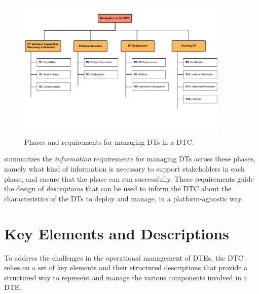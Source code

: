\begin{figure}
    \centering
    \includegraphics[width=0.9\textwidth]{figures/dtc/dtc-requirements.pdf}
    \caption{Phases and requirements for managing \acp{DT} in a \ac{DTC}.}
    \label{fig:dtc-requirements}
\end{figure}

 summarizes the \emph{information} requirements for managing \acp{DT} across these phases, namely what kind of information is necessary to support stakeholders in each phase, and ensure that the phase can run successfully.
%
These requirements guide the design of \emph{descriptions} that can be used to inform the \ac{DTC} about the characteristics of the \acp{DT} to deploy and manage, in a platform-agnostic way.


\section{Key Elements and Descriptions}

To address the challenges in the operational management of \acp{DTE}, the \ac{DTC} relies on a set of key elements and their structured descriptions that provide a structured way to represent and manage the various components involved in a \ac{DTE}.


